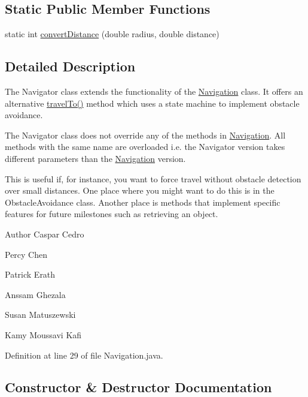 \subsection*{Static Public Member Functions}
\begin{DoxyCompactItemize}
\item 
static int \hyperlink{classca_1_1mcgill_1_1ecse211_1_1project_1_1_navigation_ac9e260bcd619ffa4820d7d0de7ea1c12}{convert\+Distance} (double radius, double distance)
\end{DoxyCompactItemize}


\subsection{Detailed Description}
The Navigator class extends the functionality of the \hyperlink{classca_1_1mcgill_1_1ecse211_1_1project_1_1_navigation}{Navigation} class. It offers an alternative \hyperlink{classca_1_1mcgill_1_1ecse211_1_1project_1_1_navigation_ad89b3dd084d81b4ec4d89ea73ba13eaa}{travel\+To()} method which uses a state machine to implement obstacle avoidance.

The Navigator class does not override any of the methods in \hyperlink{classca_1_1mcgill_1_1ecse211_1_1project_1_1_navigation}{Navigation}. All methods with the same name are overloaded i.\+e. the Navigator version takes different parameters than the \hyperlink{classca_1_1mcgill_1_1ecse211_1_1project_1_1_navigation}{Navigation} version.

This is useful if, for instance, you want to force travel without obstacle detection over small distances. One place where you might want to do this is in the Obstacle\+Avoidance class. Another place is methods that implement specific features for future milestones such as retrieving an object.

\begin{DoxyAuthor}{Author}
Caspar Cedro 

Percy Chen 

Patrick Erath 

Anssam Ghezala 

Susan Matuszewski 

Kamy Moussavi Kafi 
\end{DoxyAuthor}


Definition at line 29 of file Navigation.\+java.



\subsection{Constructor \& Destructor Documentation}
\mbox{\label{classca_1_1mcgill_1_1ecse211_1_1project_1_1_navigation_aaee14b67c392ddd951e3ce21224c3e56}} 

